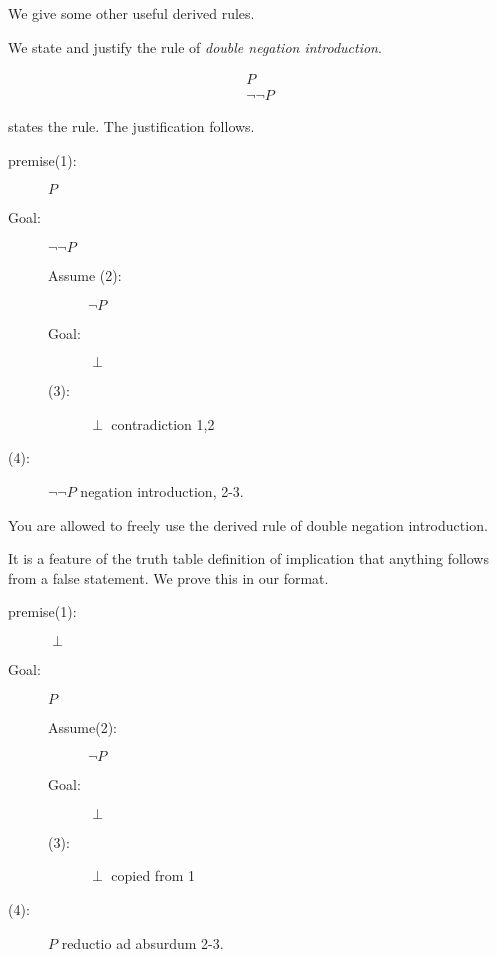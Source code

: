 \documentclass[12pt]{article}
\begin{document}
We give some other useful derived rules.

We state and justify the rule of {\em double negation introduction\/}.

$$\begin{array}{c}

P \\ \hline

\neg \neg P

\end{array}$$

states the rule.  The justification follows.

\begin{description}

\item[premise(1):]  $P$

\item[Goal:]  $\neg\neg P$

\begin{description}

\item[Assume (2):]  $\neg P$

\item[Goal:]  $\perp$

\item[(3):]  $\perp$ contradiction 1,2


\end{description}

\item[(4):]  $\neg \neg P$ negation introduction, 2-3.

\end{description}

You are allowed to freely use the derived rule of double negation introduction.

It is a feature of the truth table definition of implication that anything follows from a false statement.  We prove this in our format.

\begin{description}

\item[premise(1):]  $\perp$

\item[Goal:]  $P$

\begin{description}

\item[Assume(2):]  $\neg P$

\item[Goal:]  $\perp$

\item[(3):]  $\perp$  copied from 1

\end{description}

\item[(4):]  $P$ reductio ad absurdum 2-3.


\end{description}
\end{document}

